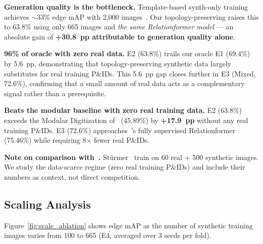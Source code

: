 \noindent\textbf{Generation quality is the bottleneck.}
Template-based synth-only training achieves ${\sim}33\%$ edge mAP
with 2,000 images~\cite{sturmer2025}.
Our topology-preserving \ours{} raises this to 63.8\% using only 665
images and \emph{the same Relationformer model} --- an absolute gain of
\textbf{+30.8~pp attributable to generation quality alone}.

\noindent\textbf{96\% of oracle with zero real data.}
E2 (63.8\%) trails our oracle E1 (69.4\%) by 5.6~pp, demonstrating that
topology-preserving synthetic data largely substitutes for real training
P\&IDs.
This 5.6~pp gap closes further in E3 (Mixed, 72.6\%), confirming that
a small amount of real data acts as a complementary signal rather than
a prerequisite.

\noindent\textbf{Beats the modular baseline with zero real training data.}
E2 (63.8\%) exceeds the Modular Digitization of~\cite{sturmer2025}
(45.89\%) by \textbf{+17.9~pp} without any real training P\&IDs.
E3 (72.6\%) approaches~\cite{sturmer2025}'s fully supervised
Relationformer (75.46\%) while requiring 8$\times$ fewer real P\&IDs.

\noindent\textbf{Note on comparison with~\cite{sturmer2025}.}
Stürmer~\etal{} train on 60 real + 500 synthetic images.
We study the data-scarce regime (zero real training P\&IDs) and include
their numbers as context, not direct competition.

\subsection{Scaling Analysis}
\label{sec:exp:scaling}

Figure~\ref{fig:scale_ablation} shows edge mAP as the number of
synthetic training images varies from 100 to 665 (E4, averaged over
3 seeds per fold).


